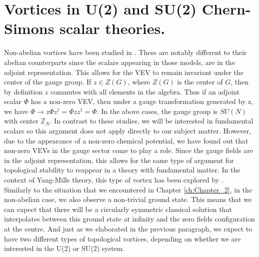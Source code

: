 
    \graphicspath{{Background_Folder/figures/PNG/}{Background_Folder/figures/PDF/}{Background_Folder/figures/}}

\chapter{Vortices in U(2) and SU(2) Chern-Simons scalar theories.}

\label{ch:Chapter_4}



Non-abelian vortices have been studied in \cite{deVega:1986eu, Kumar:1986yz, Blazquez-Salcedo:2013roa, NavarroLerida:2009dm}. These are notably different to their abelian counterparts since the scalars appearing in those models, are in the adjoint representation. This allows for the VEV to remain invariant under the center of the gauge group. If $z\in Z(G)$, where $Z(G)$ is the center of $G$, then by definition $z$ commutes with all elements in the algebra. Thus if an adjoint scalar $\Phi$ has a non-zero VEV, then under a gauge transformation generated by z, we have $\Phi \rightarrow z\Phi z^{\dag} =\Phi z z^{\dag} = \Phi$. In the above cases, the gauge group is $SU(N)$ with center $\mathbb{Z}_N$. In contrast to these studies, we will be interested in fundamental scalars so this argument does not apply directly to our subject matter. However, due to the appearance of a non-zero chemical potential, we have found out that non-zero VEVs in the gauge sector come to play a role. Since the gauge fields are in the adjoint representation, this allows for the same type of argument for topological stability to reappear in a theory with fundamental matter. In the context of Yang-Mills theory, this type of vortex has been explored by \cite{Gorbar:2005pi}.\\  
\indent Similarly to the situation that we encountered in Chapter \ref{ch:Chapter_2}, in the non-abelian case, we also observe a non-trivial ground state. This means that we can expect that there will be a circularly symmetric classical solution that interpolates between this ground state at infinity and the zero fields configuration at the centre. And just as we elaborated in the previous paragraph, we expect to have two different types of topological vortices, depending on whether we are interested in the U(2) or SU(2) system.



